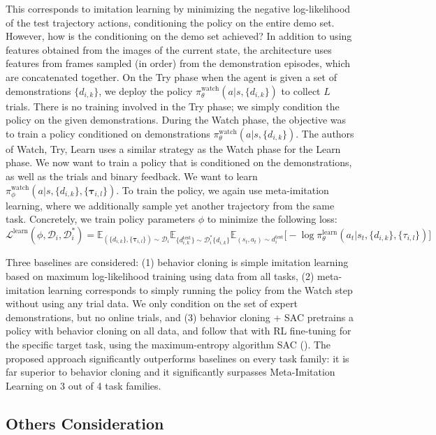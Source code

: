 \documentclass[
  letterpaper,
  numbers=noenddot,
  DIV=11]{scrreprt}
\theoremstyle{definition}
\theoremstyle{plain}
\theoremstyle{plain}
\theoremstyle{remark}
\begin{document}
This corresponds to imitation learning by minimizing the negative
log-likelihood of the test trajectory actions, conditioning the policy
on the entire demo set. However, how is the conditioning on the demo set
achieved? In addition to using features obtained from the images of the
current state, the architecture uses features from frames sampled (in
order) from the demonstration episodes, which are concatenated together.
On the Try phase when the agent is given a set of demonstrations
\(\{d_{i,k}\}\), we deploy the policy
\(\pi_\theta^{\text{watch}}(a | s, \{d_{i,k}\})\) to collect \(L\)
trials. There is no training involved in the Try phase; we simply
condition the policy on the given demonstrations. During the Watch
phase, the objective was to train a policy conditioned on demonstrations
\(\pi_\theta^{\text{watch}}(a | s, \{d_{i,k}\})\). The authors of Watch,
Try, Learn uses a similar strategy as the Watch phase for the Learn
phase. We now want to train a policy that is conditioned on the
demonstrations, as well as the trials and binary feedback. We want to
learn
\(\pi_\phi^{\text{watch}}(a | s, \{d_{i,k}\}, \{\mathbf{\tau}_{i, l}\})\).
To train the policy, we again use meta-imitation learning, where we
additionally sample yet another trajectory from the same task.
Concretely, we train policy parameters \(\phi\) to minimize the
following loss:
\[\mathcal{L}^{\text{learn}}(\phi, \mathcal{D}_i, \mathcal{D}_i^*) = \mathbb{E}_{(\{d_{i,k}\}, \{\mathbf{\tau}_{i,l}\}) \sim \mathcal{D}_i} \mathbb{E}_{\{d_{i,k}^{\text{test}}\} \sim \mathcal{D}_i^* \{d_{i,k}\}} \mathbb{E}_{(s_t, a_t) \sim d_i^{\text{test}}} \big[- \log \pi_\theta^{\text{learn}} (a_t | s_t, \{d_{i,k}\}, \{\tau_{i,l}\}) \big]\]

Three baselines are considered: (1) behavior cloning is simple imitation
learning based on maximum log-likelihood training using data from all
tasks, (2) meta-imitation learning corresponds to simply running the
policy from the Watch step without using any trial data. We only
condition on the set of expert demonstrations, but no online trials, and
(3) behavior cloning + SAC pretrains a policy with behavior cloning on
all data, and follow that with RL fine-tuning for the specific target
task, using the maximum-entropy algorithm SAC
(). The proposed
approach significantly outperforms baselines on every task family: it is
far superior to behavior cloning and it significantly surpasses
Meta-Imitation Learning on 3 out of 4 task families.

\subsection{Others Consideration}\label{others-consideration}
\end{document}
